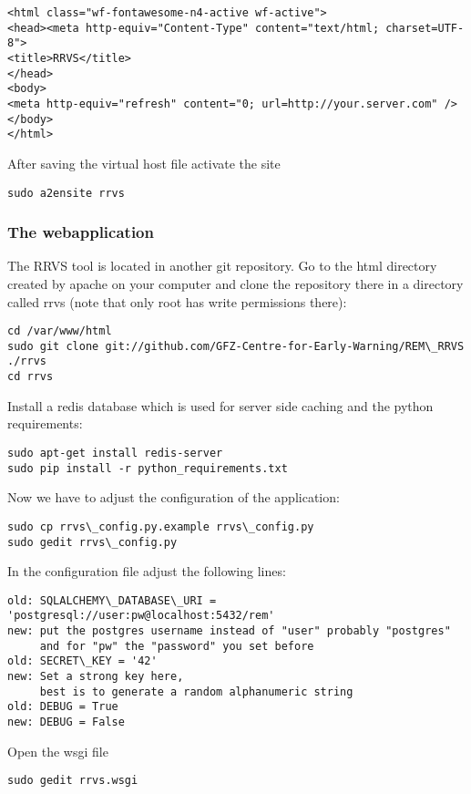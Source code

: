 \documentclass{article}
\begin{document}
\begin{verbatim}
<html class="wf-fontawesome-n4-active wf-active">
<head><meta http-equiv="Content-Type" content="text/html; charset=UTF-8"> 
<title>RRVS</title> 
</head>
<body>
<meta http-equiv="refresh" content="0; url=http://your.server.com" />
</body>
</html>
\end{verbatim}

After saving the virtual host file activate the site
\begin{verbatim}
sudo a2ensite rrvs
\end{verbatim}

\subsubsection{The webapplication}

The RRVS tool is located in another git repository. Go to
the html directory created by apache on your computer 
and clone the repository there in a directory called rrvs
(note that only root has write permissions there):
\begin{verbatim}
cd /var/www/html
sudo git clone git://github.com/GFZ-Centre-for-Early-Warning/REM\_RRVS ./rrvs
cd rrvs
\end{verbatim}

Install a redis database which is used for server side caching and
the python requirements:
\begin{verbatim}
sudo apt-get install redis-server
sudo pip install -r python_requirements.txt
\end{verbatim}

Now we have to adjust the configuration of the application:
\begin{verbatim}
sudo cp rrvs\_config.py.example rrvs\_config.py
sudo gedit rrvs\_config.py
\end{verbatim}

In the configuration file adjust the following lines:

\begin{verbatim}
old: SQLALCHEMY\_DATABASE\_URI = 'postgresql://user:pw@localhost:5432/rem'
new: put the postgres username instead of "user" probably "postgres" 
     and for "pw" the "password" you set before
old: SECRET\_KEY = '42'
new: Set a strong key here, 
     best is to generate a random alphanumeric string
old: DEBUG = True
new: DEBUG = False

\end{verbatim}

Open the wsgi file
\begin{verbatim}
sudo gedit rrvs.wsgi
\end{verbatim}
 
\end{document}
